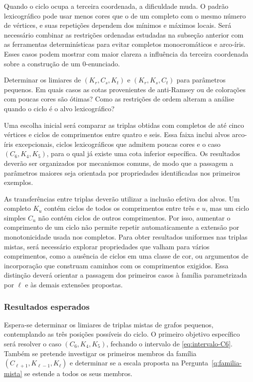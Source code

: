 \documentclass[11pt,a4paper]{article}
\theoremstyle{plain}
\theoremstyle{definition}
\newcounter{question}[section]
\renewcommand{\thequestion}{\thesection.\arabic{question}}
\newenvironment{question}[1][]{%
  \refstepcounter{question}%
  \begin{tcolorbox}[
    enhanced,
    colback=qbluebg,
    colframe=qblue,
    arc=4pt,
    boxrule=1.2pt,
    left=8pt, right=8pt, top=6pt, bottom=6pt,
    fonttitle=\bfseries\sffamily,
    title={\color{white}Pergunta~\thequestion\ifx&#1&\else\ (#1)\fi},
    coltitle=white,
    attach boxed title to top left={yshift=-2mm, xshift=6pt},
    boxed title style={colback=qblue, arc=3pt, boxrule=0pt},
  ]%
  \itshape
}{%
  \end{tcolorbox}%
}
\begin{document}
Quando o ciclo ocupa a terceira coordenada, a dificuldade muda.
O padrão lexicográfico pode usar menos cores que o de um completo
com o mesmo número de vértices, e suas repetições dependem dos
mínimos e máximos locais. Será necessário combinar as restrições
ordenadas estudadas na subseção anterior com as ferramentas
determinísticas para evitar completos monocromáticos e arco-íris.
Esses casos podem mostrar com maior clareza a influência da
terceira coordenada sobre a construção de um $0$-enunciado.

\begin{question}[o ciclo na segunda ou na terceira coordenada]
  \label{q:posicoes}
  Determinar os limiares de $(K_r,C_s,K_t)$ e
  $(K_r,K_s,C_t)$ para parâmetros pequenos. Em quais casos
  as cotas provenientes de anti-Ramsey ou de colorações com
  poucas cores são ótimas? Como as restrições de ordem
  alteram a análise quando o ciclo é o alvo lexicográfico?
\end{question}

Uma escolha inicial será comparar as triplas obtidas com completos
de até cinco vértices e ciclos de comprimentos entre quatro e
seis. Essa faixa inclui alvos arco-íris excepcionais, ciclos
lexicográficos que admitem poucas cores e o caso
$(C_6,K_4,K_5)$, para o qual já existe uma cota inferior
específica. Os resultados deverão ser organizados por mecanismos
comuns, de modo que a passagem a parâmetros maiores seja orientada
por propriedades identificadas nos primeiros exemplos.

As transferências entre triplas deverão utilizar a inclusão
efetiva dos alvos. Um completo $K_u$ contém ciclos de todos
os comprimentos entre três e $u$, mas um ciclo simples
$C_u$ não contém ciclos de outros comprimentos. Por isso,
aumentar o comprimento de um ciclo não permite repetir
automaticamente a extensão por monotonicidade usada nos
completos. Para obter resultados uniformes nas triplas
mistas, será necessário explorar propriedades que valham
para vários comprimentos, como a ausência de ciclos em
uma classe de cor, ou argumentos de incorporação que
construam caminhos com os comprimentos exigidos. Essa
distinção deverá orientar a passagem dos primeiros
casos à família parametrizada por $\ell$ e às demais
extensões propostas.

\subsubsection{Resultados esperados}

Espera-se determinar os limiares de triplas mistas de grafos
pequenos, contemplando as três posições possíveis do ciclo.
O primeiro objetivo específico será resolver o caso
$(C_6,K_4,K_5)$, fechando o intervalo de
\eqref{eq:intervalo-C6}. Também se pretende investigar os
primeiros membros da família
$(C_{\ell+1},K_{\ell-1},K_\ell)$ e determinar se a escala
proposta na Pergunta~\ref{q:familia-mista} se estende a
todos os seus membros.
\end{document}

